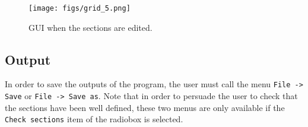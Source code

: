 \begin{figure}[h!]
\centering
\texttt{[image: figs/grid\_5.png]}
\caption{GUI when the sections are edited.}
\label{fig:grid_5}
\end{figure}

\subsection{Output}

In order to save the outputs of the program, the user must call the
menu \verb+File -> Save+ or \verb+File -> Save as+. Note that in order
to persuade the user to check that the sections have been well
defined, these two menus are only available if the 
\verb+Check sections+ item of the radiobox is selected.